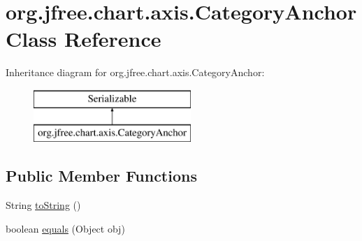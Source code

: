 \hypertarget{classorg_1_1jfree_1_1chart_1_1axis_1_1_category_anchor}{}\section{org.\+jfree.\+chart.\+axis.\+Category\+Anchor Class Reference}
\label{classorg_1_1jfree_1_1chart_1_1axis_1_1_category_anchor}
Inheritance diagram for org.\+jfree.\+chart.\+axis.\+Category\+Anchor\+:\begin{figure}[H]
\begin{center}
\leavevmode
\includegraphics[height=2.000000cm]{classorg_1_1jfree_1_1chart_1_1axis_1_1_category_anchor}
\end{center}
\end{figure}
\subsection*{Public Member Functions}
\begin{DoxyCompactItemize}
\item 
String \mbox{\hyperlink{classorg_1_1jfree_1_1chart_1_1axis_1_1_category_anchor_a4cf779147a635b113bc0360021a44406}{to\+String}} ()
\item 
boolean \mbox{\hyperlink{classorg_1_1jfree_1_1chart_1_1axis_1_1_category_anchor_a41e20c57f7105a7d5067fa12a9db0df8}{equals}} (Object obj)
\end{DoxyCompactItemize}
